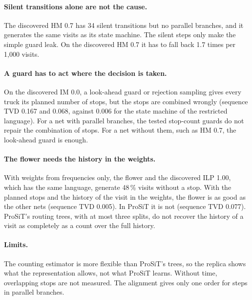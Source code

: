 \paragraph{Silent transitions alone are not the cause.} The discovered HM 0.7 has
34 silent transitions but no parallel branches, and it generates the same visits
as its state machine. The silent steps only make the simple guard leak. On the
discovered HM 0.7 it has to fall back 1.7 times per 1,000 visits.

\paragraph{A guard has to act where the decision is taken.} On the discovered
IM 0.0, a look-ahead guard or rejection sampling gives every truck its planned
number of stops, but the stops are combined wrongly (sequence TVD 0.167 and 0.068,
against 0.006 for the state machine of the restricted language). For a net with parallel
branches, the tested stop-count guards do not repair the combination of stops. For a net without them, such
as HM 0.7, the look-ahead guard is enough.

\paragraph{The flower needs the history in the weights.} With weights from
frequencies only, the flower and the discovered ILP 1.00, which has the same
language, generate 48\,\% visits without a stop. With the planned stops and the
history of the visit in the weights, the flower is as good as the other nets
(sequence TVD 0.005). In ProSiT it is not (sequence TVD 0.077). ProSiT's routing
trees, with at most three splits, do not recover the history of a visit as
completely as a count over the full history.

\paragraph{Limits.} The counting estimator is more flexible than ProSiT's trees,
so the replica shows what the representation allows, not what ProSiT learns.
Without time, overlapping stops are not measured. The alignment gives only one
order for steps in parallel branches.

